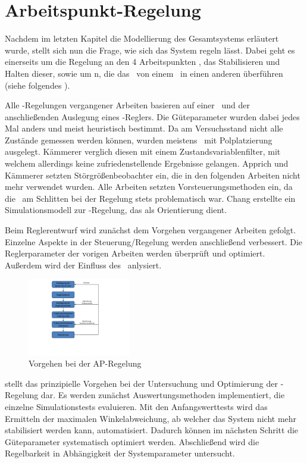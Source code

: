 \chapter{Arbeitspunkt-Regelung}\label{cha:apr}

Nachdem im letzten Kapitel die Modellierung des Gesamtsystems erläutert wurde, stellt sich nun die Frage, wie sich das System regeln lässt. Dabei geht es einerseits um die Regelung an den 4 Arbeitspunkten , \dah das Stabilisieren und Halten dieser, sowie um \traj n, die das \dpd\ von einem \ap\ in einen anderen überführen (siehe folgendes ).

Alle \ap -Regelungen vergangener Arbeiten basieren auf einer \lin\ und der anschließenden Auslegung eines \ricc-Reglers.
Die Güteparameter wurden dabei jedes Mal anders und meist heuristisch bestimmt.
Da am Versuchsstand nicht alle Zustände gemessen werden können, wurden meistens \beob\ mit Polplatzierung ausgelegt.
Kämmerer \cite{kämmerer} verglich diesen mit einem Zustandsvariablenfilter, mit welchem allerdings keine zufriedenstellende Ergebnisse gelangen.
Apprich \cite{apprich} und Kämmerer \cite{kämmerer} setzten Störgrößenbeobachter ein, die in den folgenden Arbeiten nicht mehr verwendet wurden.
Alle Arbeiten setzten Vorsteuerungsmethoden ein, da die \crb\ am Schlitten bei der Regelung stets problematisch war.
Chang \cite{chang} erstellte ein Simulationsmodell zur \ap-Regelung, das als Orientierung dient.

Beim Reglerentwurf wird zunächst dem Vorgehen vergangener Arbeiten gefolgt. 
Einzelne Aspekte in der Steuerung/Regelung werden anschließend verbessert.
Die Reglerparameter der vorigen Arbeiten werden überprüft und optimiert.
Außerdem wird der Einfluss des \beob\ anlysiert.

\begin{figure}[hb]
	\centering
		\includegraphics[width=0.4\textwidth]{Bilder/Regelung Vorgehen.pdf}
	\caption{Vorgehen bei der AP-Regelung }
	\label{fig:regvorg}
\end{figure}

 stellt das prinzipielle Vorgehen bei der Untersuchung und Optimierung der \ap-Regelung dar.
Es werden zunächst Auswertungsmethoden implementiert, die einzelne Simulationstests evaluieren.
Mit den Anfangswerttests wird das Ermitteln der maximalen Winkelabweichung, ab welcher das System nicht mehr stabilisiert werden kann, automatisiert.
Dadurch können im nächsten Schritt die Güteparameter systematisch optimiert werden.
Abschließend wird die Regelbarkeit in Abhängigkeit der Systemparameter untersucht.

